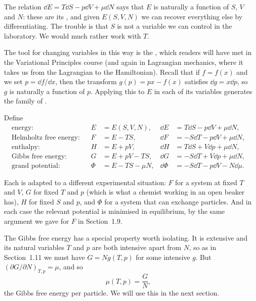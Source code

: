 The relation $\dd E = T\dd S - p\dd V + \mu\dd N$ says that $E$ is naturally a function of $S$, $V$ and $N$: these are its , and given $E(S,V,N)$ we can recover everything else by differentiating. The trouble is that $S$ is not a variable we can control in the laboratory. We would much rather work with $T$.

The tool for changing variables in this way is the , which readers will have met in the Variational Principles course (and again in Lagrangian mechanics, where it takes us from the Lagrangian to the Hamiltonian). Recall that if $f = f(x)$ and we set $p = \dd f/\dd x$, then the transform $g(p) = px - f(x)$ satisfies $\dd g = x \dd p$, so $g$ is naturally a function of $p$. Applying this to $E$ in each of its variables generates the family of .

\begin{definition}
	Define
	\begin{align*}
		\text{energy:} && E &= E(S,V,N), & \dd E &= T\dd S - p \dd V + \mu\dd N,\\
		\text{Helmholtz free energy:} && F &= E - TS, & \dd F &= -S\dd T - p\dd V + \mu\dd N,\\
		\text{enthalpy:} && H &= E + pV, & \dd H &= T\dd S + V\dd p + \mu \dd N,\\
		\text{Gibbs free energy:} && G &= E + pV - TS, & \dd G &= -S\dd T + V\dd p + \mu\dd N,\\
		\text{grand potential:} && \Phi &= E - TS - \mu N, & \dd\Phi &= -S\dd T - p\dd V - N\dd \mu.
	\end{align*}
\end{definition}

Each is adapted to a different experimental situation: $F$ for a system at fixed $T$ and $V$, $G$ for fixed $T$ and $p$ (which is what a chemist working in an open beaker has), $H$ for fixed $S$ and $p$, and $\Phi$ for a system that can exchange particles. And in each case the relevant potential is minimised in equilibrium, by the same argument we gave for $F$ in Section~1.9.

The Gibbs free energy has a special property worth isolating. It is extensive and its natural variables $T$ and $p$ are both intensive apart from $N$, so as in Section~1.11 we must have $G = N g(T,p)$ for some intensive $g$. But $(\partial G/\partial N)_{T,p} = \mu$, and so
$$
\mu(T,p) = \frac GN,
$$
the Gibbs free energy per particle. We will use this in the next section.

